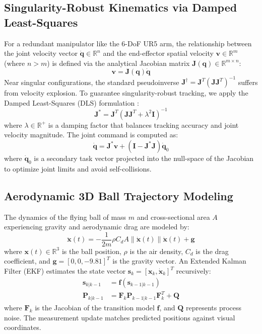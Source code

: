 \documentclass[letterpaper,journal]{IEEEtran}
\begin{document}
\subsection{Singularity-Robust Kinematics via Damped Least-Squares}
For a redundant manipulator like the 6-DoF UR5 arm, the relationship between the joint velocity vector $\dot{\mathbf{q}} \in \mathbb{R}^n$ and the end-effector spatial velocity $\mathbf{v} \in \mathbb{R}^m$ (where $n > m$) is defined via the analytical Jacobian matrix $\mathbf{J}(\mathbf{q}) \in \mathbb{R}^{m \times n}$:
\begin{equation}
\mathbf{v} = \mathbf{J}(\mathbf{q}) \dot{\mathbf{q}}
\end{equation}
Near singular configurations, the standard pseudoinverse $\mathbf{J}^\dagger = \mathbf{J}^T (\mathbf{J} \mathbf{J}^T)^{-1}$ suffers from velocity explosion. To guarantee singularity-robust tracking, we apply the Damped Least-Squares (DLS) formulation \cite{wholbody_mpc}:
\begin{equation}
\mathbf{J}^* = \mathbf{J}^T \left( \mathbf{J} \mathbf{J}^T + \lambda^2 \mathbf{I} \right)^{-1}
\end{equation}
where $\lambda \in \mathbb{R}^+$ is a damping factor that balances tracking accuracy and joint velocity magnitude. The joint command is computed as:
\begin{equation}
\dot{\mathbf{q}} = \mathbf{J}^* \mathbf{v} + \left( \mathbf{I} - \mathbf{J}^* \mathbf{J} \right) \dot{\mathbf{q}}_0
\end{equation}
where $\dot{\mathbf{q}}_0$ is a secondary task vector projected into the null-space of the Jacobian to optimize joint limits and avoid self-collisions.

\subsection{Aerodynamic 3D Ball Trajectory Modeling}
The dynamics of the flying ball of mass $m$ and cross-sectional area $A$ experiencing gravity and aerodynamic drag are modeled by:
\begin{equation}
\ddot{\mathbf{x}}(t) = -\frac{1}{2m} \rho C_d A \|\dot{\mathbf{x}}(t)\| \dot{\mathbf{x}}(t) + \mathbf{g}
\end{equation}
where $\mathbf{x}(t) \in \mathbb{R}^3$ is the ball position, $\rho$ is the air density, $C_d$ is the drag coefficient, and $\mathbf{g} = [0, 0, -9.81]^T$ is the gravity vector. An Extended Kalman Filter (EKF) estimates the state vector $\mathbf{s}_k = [\mathbf{x}_k, \dot{\mathbf{x}}_k]^T$ recursively:
\begin{align}
\mathbf{s}_{k|k-1} &= \mathbf{f}(\mathbf{s}_{k-1|k-1}) \\
\mathbf{P}_{k|k-1} &= \mathbf{F}_k \mathbf{P}_{k-1|k-1} \mathbf{F}_k^T + \mathbf{Q}
\end{align}
where $\mathbf{F}_k$ is the Jacobian of the transition model $\mathbf{f}$, and $\mathbf{Q}$ represents process noise. The measurement update matches predicted positions against visual coordinates.
\end{document}
